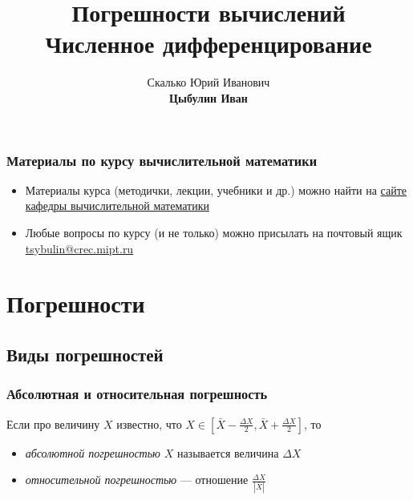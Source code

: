 \documentclass[aspectratio=169,unicode]{beamer}
\title[Погрешности. Дифференцирование]{Погрешности вычислений\\Численное дифференцирование}
\author[Цыбулин Иван]{\texorpdfstring{Скалько Юрий Иванович\\\textbf{Цыбулин
Иван}}{Цыбулин Иван}}
\date{}
\newcommand{\colorhref}[2]{\href{#1}{\textcolor{miptbase!30!black}{#2}}}
\begin{document}
\begin{frame}[plain]
  \titlepage %
\end{frame}

\section{}
\subsection{}

\begin{frame}
	\frametitle{Материалы по курсу вычислительной математики}
	\begin{itemize}
		\item Материалы курса (методички, лекции, учебники и др.) можно найти
			на \colorhref{http://crec.mipt.ru/study/materials/compmath/}
			{сайте кафедры вычислительной математики}
		\item
		Любые вопросы по курсу (и не только) можно присылать на почтовый ящик
		\colorhref{mailto:tsybulin@crec.mipt.ru}{tsybulin@crec.mipt.ru}
\end{itemize}
\end{frame}

\section{Погрешности}
\subsection{Виды погрешностей}
\begin{frame}
\frametitle{Абсолютная и относительная погрешность}
Если про величину $X$ известно, что $X \in [\bar{X}-\frac{\Delta X}{2}, \bar{X}+\frac{\Delta X}{2}]$, то
\begin{itemize}
	\item \emph{абсолютной погрешностью} $X$ называется величина $\Delta X$
	\item \emph{относительной погрешностью} --- отношение $\frac{\Delta X}{\left|\bar{X}\right|}$
\end{itemize}
\end{frame}
\end{document}
